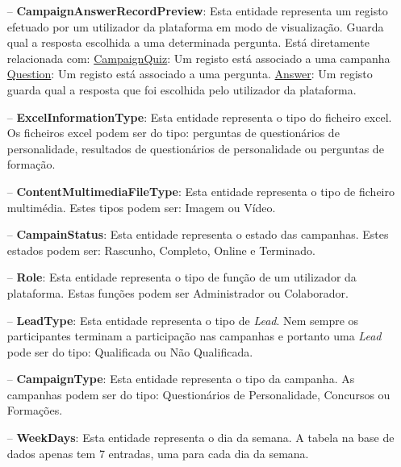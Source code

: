 \begin{itemize}
	\item[--] \textbf{CampaignAnswerRecordPreview}: Esta entidade representa um registo efetuado por um utilizador da plataforma em modo de visualização. Guarda qual a resposta escolhida a uma determinada pergunta. Está diretamente relacionada com:
	\subitem \underline{CampaignQuiz}: Um registo está associado a uma campanha
	\subitem \underline{Question}: Um registo está associado a uma pergunta.
	\subitem \underline{Answer}: Um registo guarda qual a resposta que foi escolhida pelo utilizador da plataforma.
	\item[--] \textbf{ExcelInformationType}: Esta entidade representa o tipo do ficheiro excel. Os ficheiros excel podem ser do tipo: perguntas de questionários de personalidade, resultados de questionários de personalidade ou perguntas de formação.
	\item[--] \textbf{ContentMultimediaFileType}: Esta entidade representa o tipo de ficheiro multimédia. Estes tipos podem ser:  Imagem ou Vídeo.
	\item[--] \textbf{CampainStatus}: Esta entidade representa o estado das campanhas. Estes estados podem ser: Rascunho, Completo, Online e Terminado.
	\item[--] \textbf{Role}: Esta entidade representa o tipo de função de um utilizador da plataforma. Estas funções podem ser Administrador ou Colaborador.
	\item[--] \textbf{LeadType}: Esta entidade representa o tipo de \textit{Lead}. Nem sempre os participantes terminam a participação nas campanhas e portanto uma \textit{Lead} pode ser do tipo: Qualificada ou Não Qualificada.
	\item[--] \textbf{CampaignType}: Esta entidade representa o tipo da campanha. As campanhas podem ser do tipo: Questionários de Personalidade, Concursos ou Formações. 
	\item[--] \textbf{WeekDays}: Esta entidade representa o dia da semana. A tabela na base de dados apenas tem 7 entradas, uma para cada dia da semana.
\end{itemize}












\blankpage

\glsresetall
